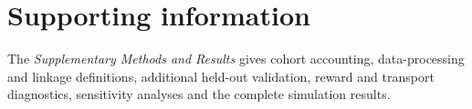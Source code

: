 \documentclass[11pt,letterpaper]{article}
\begin{document}
\section*{Supporting information}
The \emph{Supplementary Methods and Results} gives cohort accounting, data-processing and linkage definitions, additional held-out validation, reward and transport diagnostics, sensitivity analyses and the complete simulation results.


\clearpage
\end{document}
